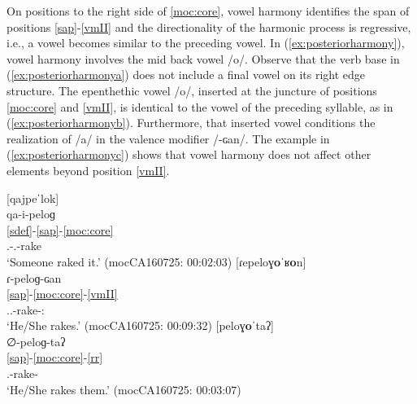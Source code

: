 \documentclass[output=paper]{langscibook}
\begin{document}
On positions to the right side of \ref{moc:core}, vowel harmony identifies the span of positions \ref{sap}-\ref{vmII} and the directionality of the harmonic process is regressive, i.e., a vowel becomes similar to the preceding vowel. In (\ref{ex:posteriorharmony}), vowel harmony involves the mid back vowel /o/. Observe that the verb base in (\ref{ex:posteriorharmonya}) does not include a final vowel on its right edge structure. The epenthethic vowel /o/, inserted at the juncture of positions \ref{moc:core} and \ref{vmII}, is identical to the vowel of the preceding syllable, as in (\ref{ex:posteriorharmonyb}). Furthermore, that inserted vowel conditions the realization of /a/ in the valence modifier /-ɢan/. The example in  (\ref{ex:posteriorharmonyc}) shows that vowel harmony does not affect other elements beyond position \ref{vmII}. 

\newpage
\ea \label{ex:posteriorharmony}
\ea\label{ex:posteriorharmonya}
 [qajpeˈlok]\\
\glll qa-i-peloɡ\\
\ref{sdef}-\ref{sap}-\ref{moc:core}\\
{\Sbj.\Def}-{\Third.\II}-rake\\
\glt `Someone raked it.' \hfill(mocCA160725: 00:02:03)
\ex\label{ex:posteriorharmonyb}
 [ɾepeloɣ\textbf{o}ˈʁ\textbf{o}n]\\
\glll ɾ-peloɡ-ɢan\\
\ref{sap}-\ref{moc:core}-\ref{vmII}\\
{\Third.\II.\Intr}-rake-{\Vm:\Intr}\\
\glt `He/She rakes.' \hfill(mocCA160725: 00:09:32)
\ex\label{ex:posteriorharmonyc}
 [peloɣ\textbf{o}ˈtaʔ]\\
\glll ∅-peloɡ-taʔ\\
\ref{sap}-\ref{moc:core}-\ref{rr}\\
{\Third.\II}-rake-{\Recp}\\
\glt `He/She rakes them.' \hfill(mocCA160725: 00:03:07)
\z
\z 

\end{document}
